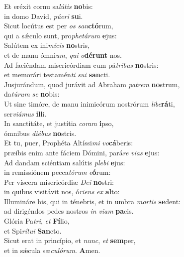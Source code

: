 \evenverse Et eréxit cornu sa\textit{lú}\textit{tis} \textbf{no}bis:~\*\\
\evenverse in domo David, \textit{pú}\textit{e}\textit{ri} \textbf{su}i.\\
\oddverse Sicut locútus est per \textit{os} \textit{san}\textbf{ctó}rum,~\*\\
\oddverse qui a sǽculo sunt, pro\textit{phe}\textit{tá}\textit{rum} \textbf{e}jus:\\
\evenverse Salútem ex ini\textit{mí}\textit{cis} \textbf{no}stris,~\*\\
\evenverse et de manu ómni\textit{um}, \textit{qui} \textit{o}\textbf{dé}\textbf{runt} nos.\\
\oddverse Ad faciéndam misericórdiam cum pá\textit{tri}\textit{bus} \textbf{no}stris:~\*\\
\oddverse et memorári testamén\textit{ti} \textit{su}\textit{i} \textbf{san}cti.\\
\evenverse Jusjurándum, quod jurávit ad Abraham \textit{pa}\textit{trem} \textbf{no}strum,~\*\\
\evenverse da\textit{tú}\textit{rum} \textit{se} \textbf{no}bis:\\
\oddverse Ut sine timóre, de manu inimicórum nostrórum \textit{li}\textit{be}\textbf{rá}ti,~\*\\
\oddverse ser\textit{vi}\textit{á}\textit{mus} \textbf{il}li.\\
\evenverse In sanctitáte, et justítia \textit{co}\textit{ram} \textbf{i}pso,~\*\\
\evenverse ómnibus \textit{di}\textit{é}\textit{bus} \textbf{no}stris.\\
\oddverse Et tu, puer, Prophéta Altíssi\textit{mi} \textit{vo}\textbf{cá}beris:~\*\\
\oddverse præíbis enim ante fáciem Dómini, pará\textit{re} \textit{vi}\textit{as} \textbf{e}jus:\\
\evenverse Ad dandam sciéntiam salútis \textit{ple}\textit{bi} \textbf{e}jus:~\*\\
\evenverse in remissiónem pecca\textit{tó}\textit{rum} \textit{e}\textbf{ó}rum:\\
\oddverse Per víscera misericórdiæ \textit{De}\textit{i} \textbf{no}stri:~\*\\
\oddverse in quibus visitávit nos, ó\textit{ri}\textit{ens} \textit{ex} \textbf{al}to:\\
\evenverse Illumináre his, qui in ténebris, et in umbra \textit{mor}\textit{tis} \textbf{se}dent:~\*\\
\evenverse ad dirigéndos pedes nostros \textit{in} \textit{vi}\textit{am} \textbf{pa}cis.\\
\oddverse Glória Pa\textit{tri}, \textit{et} \textbf{Fí}lio,~\*\\
\oddverse et Spi\textit{rí}\textit{tu}\textit{i} \textbf{San}cto.\\
\evenverse Sicut erat in princípio, et \textit{nunc}, \textit{et} \textbf{sem}per,~\*\\
\evenverse et in sǽcula sæ\textit{cu}\textit{ló}\textit{rum}. \textbf{A}men.\\
